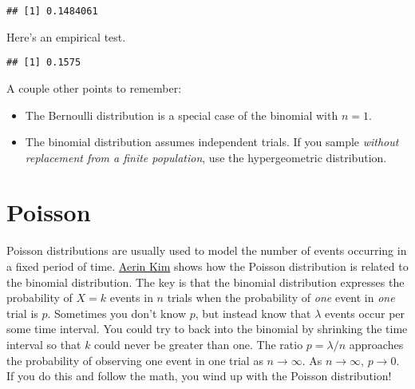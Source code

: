 \documentclass[
]{book}
\newenvironment{Shaded}{\begin{snugshade}}{\end{snugshade}}
\newcommand{\DataTypeTok}[1]{\textcolor[rgb]{0.13,0.29,0.53}{#1}}
\newcommand{\DecValTok}[1]{\textcolor[rgb]{0.00,0.00,0.81}{#1}}
\newcommand{\FloatTok}[1]{\textcolor[rgb]{0.00,0.00,0.81}{#1}}
\newcommand{\KeywordTok}[1]{\textcolor[rgb]{0.13,0.29,0.53}{\textbf{#1}}}
\newcommand{\NormalTok}[1]{#1}
\newcommand{\OperatorTok}[1]{\textcolor[rgb]{0.81,0.36,0.00}{\textbf{#1}}}
\newcommand{\StringTok}[1]{\textcolor[rgb]{0.31,0.60,0.02}{#1}}
\providecommand{\tightlist}{%
  \setlength{\itemsep}{0pt}\setlength{\parskip}{0pt}}
\begin{document}
\begin{verbatim}
## [1] 0.1484061
\end{verbatim}

Here's an empirical test.

\begin{Shaded}
\end{Shaded}

\begin{verbatim}
## [1] 0.1575
\end{verbatim}

A couple other points to remember:

\begin{itemize}
\tightlist
\item
  The Bernoulli distribution is a special case of the binomial with \(n = 1\).
\item
  The binomial distribution assumes independent trials. If you sample \emph{without replacement from a finite population}, use the hypergeometric distribution.
\end{itemize}

\hypertarget{poisson}{%
\section{Poisson}\label{poisson}}

Poisson distributions are usually used to model the number of events occurring in a fixed period of time. \href{https://towardsdatascience.com/poisson-distribution-intuition-and-derivation-1059aeab90d}{Aerin Kim} shows how the Poisson distribution is related to the binomial distribution. The key is that the binomial distribution expresses the probability of \(X = k\) events in \(n\) trials when the probability of \emph{one} event in \emph{one} trial is \(p\). Sometimes you don't know \(p\), but instead know that \(\lambda\) events occur per some time interval. You could try to back into the binomial by shrinking the time interval so that \(k\) could never be greater than one. The ratio \(p = \lambda / n\) approaches the probability of observing one event in one trial as \(n \rightarrow \infty\). As \(n \rightarrow \infty\), \(p \rightarrow 0\). If you do this and follow the math, you wind up with the Poisson distribution!
\end{document}
